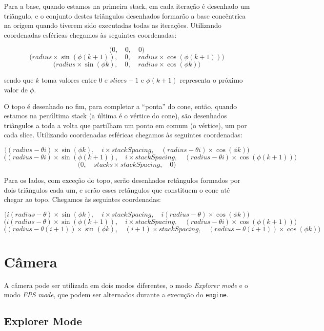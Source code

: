 \documentclass[a4paper]{article}
\newcommand{\x}{\times}
\begin{document}
Para a base, quando estamos na primeira stack, em cada iteração é desenhado um triângulo, e o conjunto destes triângulos desenhados formarão a base concêntrica na origem quando tiverem sido executadas todas as iterações. Utilizando coordenadas esféricas chegamos às seguintes coordenadas:

 \[\Big(0,\quad 0,\quad 0\Big)\]
 \[\Big(radius \x \sin(\phi (k+1)),\quad 0,\quad radius \x \cos(\phi (k+1))\Big)\]
 \[\Big(radius \x \sin(\phi k),\quad 0,\quad radius \x \cos(\phi k)\Big)\]

sendo que $k$ toma valores entre $0$ e $slices-1$ e $\phi (k+1)$ representa o próximo valor de $\phi$.

O topo é desenhado no fim, para completar a ``ponta'' do cone, então, quando estamos na penúltima stack (a última é o vértice do cone), são desenhados triângulos a toda a volta que partilham um ponto em comum (o vértice), um por cada slice. Utilizando coordenadas esféricas chegamos às seguintes coordenadas:

\[\Big((radius - \theta i) \x \sin(\phi k),\quad i \x stackSpacing,\quad (radius - \theta i) \x \cos(\phi k)\Big)\]
\[\Big((radius - \theta i) \x \sin(\phi (k + 1)),\quad i \x stackSpacing,\quad (radius - \theta i) \x \cos(\phi (k + 1))\Big)\]
\[\Big(0,\quad stacks \x stackSpacing,\quad 0\Big)\]

Para os lados, com exceção do topo, serão desenhados retângulos formados por dois triângulos cada um, e serão esses retângulos que constituem o cone até chegar ao topo. Chegamos às seguintes coordenadas:

\[\Big(i(radius - \theta) \x \sin(\phi k),\quad i \x stackSpacing,\quad i(radius - \theta) \x \cos(\phi k)\Big)\]
\[\Big(i(radius - \theta) \x \sin(\phi (k + 1)),\quad i \x stackSpacing,\quad (radius - \theta i) \x \cos(\phi (k + 1))\Big)\]
\[\Big((radius - \theta (i + 1)) \x \sin(\phi k),\quad (i + 1) \x stackSpacing,\quad (radius - \theta (i + 1)) \x \cos(\phi k)\Big)\]

\section{Câmera}
A câmera pode ser utilizada em dois modos diferentes, o modo \textit{Explorer mode} e o modo \textit{FPS mode}, que podem ser alternados durante a execução do \texttt{engine}.

\subsection{Explorer Mode}
\end{document}
